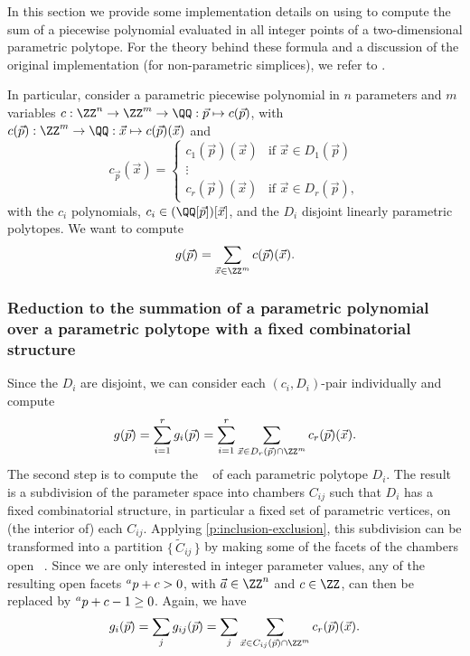 In this section we provide some implementation details
on using  to compute
the sum of a piecewise polynomial evaluated in all integer
points of a two-dimensional parametric polytope.
For the theory behind these formula and a discussion
of the original implementation (for non-parametric simplices),
we refer to .

In particular, consider a parametric piecewise polynomial
in $n$ parameters and $m$ variables
$c : \ZZ^n \to \ZZ^m \to \QQ : \vec p \mapsto c(\vec p)$,
with $c(\vec p) : \ZZ^m \to \QQ : \vec x \mapsto c(\vec p)(\vec x)$
and
$$
c_{\vec p}(\vec x) =
\begin{cases}
c_1(\vec p)(\vec x) & \text{if $\vec x \in D_1(\vec p)$}
\\
\vdots
\\
c_r(\vec p)(\vec x) & \text{if $\vec x \in D_r(\vec p)$}
,
\end{cases}
$$
with the $c_i$ polynomials, $c_i \in (\QQ[\vec p])[\vec x]$, and 
the $D_i$ disjoint linearly parametric polytopes.
We want to compute
$$
g(\vec p) = \sum_{\vec x \in \ZZ^m} c(\vec p)(\vec x)
.
$$

\subsubsection{Reduction to the summation of a parametric polynomial
over a parametric polytope with a fixed combinatorial structure}

Since the $D_i$ are disjoint, we can consider each
$(c_i, D_i)$-pair individually and compute
$$
g(\vec p) = \sum_{i=1}^r g_i(\vec p) =
\sum_{i=1}^r \sum_{\vec x \in D_r(\vec p) \cap \ZZ^m} c_r(\vec p)(\vec x)
.
$$
The second step is to compute the 
~ of each parametric
polytope $D_i$.
The result is a subdivision of the parameter space into chambers
$C_{ij}$ such that $D_i$ has a fixed combinatorial structure,
in particular a fixed set of parametric vertices,
on (the interior of) each $C_{ij}$.  Applying \autoref{p:inclusion-exclusion},
this subdivision can be transformed into a partition
$\{\, \tilde C_{ij} \,\}$ by
making some of the facets of the chambers open%
~.
Since we are only interested in integer parameter values,
any of the resulting open facets $\sp a p + c > 0$,
with $\vec a \in \ZZ^n$ and $c \in \ZZ$,
can then be replaced by  $\sp a p + c-1 \ge 0$.
Again, we have
$$
g_i(\vec p) = \sum_j g_{ij}(\vec p) =
\sum_j \sum_{\vec x \in C_{ij}(\vec p) \cap \ZZ^m} c_r(\vec p)(\vec x)
.
$$

